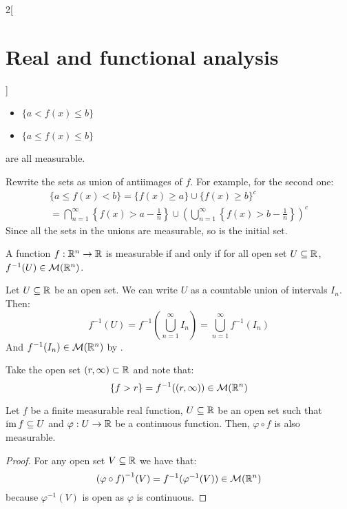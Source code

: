 \documentclass[../../../main_math.tex]{subfiles}
\begin{document}
\begin{multicols}{2}[\section{Real and functional analysis}]
\begin{lemma}
\begin{itemize}
      \item $\{a<f(x)\leq b\}$
      \item $\{a\leq f(x)\leq b\}$
    \end{itemize}
    are all measurable.
  \end{lemma}
  \begin{sproof}
    Rewrite the sets as union of antiimages of $f$. For example, for the second one:
    \begin{multline*}
      \{a\leq f(x)<b\}  =\{f(x)\geq a\}\cup{\{f(x)\geq b\}}^c                                                  \\
      =\bigcap_{n=1}^\infty \left\{f(x)>a-\frac{1}{n}\right\}\cup{\left(\bigcup_{n=1}^\infty\left\{f(x)>b-\frac{1}{n}\right\}\right)}^c
    \end{multline*}
    Since all the sets in the unions are measurable, so is the initial set.
  \end{sproof}
  \begin{proposition}
    A function $f:\mathbb{R}^n\rightarrow\mathbb{R}$ is measurable if and only if for all open set $U\subseteq \mathbb{R}$, $f^{-1}(U)\in\mathcal{M}(\mathbb{R}^n)$.
  \end{proposition}
  \begin{sproof}
    \begin{itemizeiff}
      Let $U\subseteq \mathbb{R}$ be an open set. We can write $U$ as a countable union of intervals $I_n$. Then: $$f^{-1}(U)=f^{-1}\left(\bigcup_{n=1}^\infty I_n\right)=\bigcup_{n=1}^\infty f^{-1}(I_n)$$ And $f^{-1}(I_n)\in\mathcal{M}(\mathbb{R}^n)$ by .
      \item Take the open set $(r,\infty)\subset\mathbb{R}$ and note that: $$\{f>r\}=f^{-1}((r,\infty))\in\mathcal{M}(\mathbb{R}^n)$$
    \end{itemizeiff}
  \end{sproof}
  \begin{proposition}
    Let $f$ be a finite measurable real function, $U\subseteq\mathbb{R}$ be an open set such that $\operatorname{im} f\subseteq U$ and $\varphi:U\rightarrow\mathbb{R}$ be a continuous function. Then, $\varphi\circ f$ is also measurable.
  \end{proposition}
  \begin{proof}
    For any open set $V\subseteq\mathbb{R}$ we have that: $${(\varphi\circ f)}^{-1}(V)=f^{-1}(\varphi^{-1}(V))\in\mathcal{M}(\mathbb{R}^n)$$ because $\varphi^{-1}(V)$ is open as $\varphi$ is continuous.
  \end{proof}
  \begin{proposition}\label{RFA:sumproduct}

\end{proposition}
\end{multicols}
\end{document}
